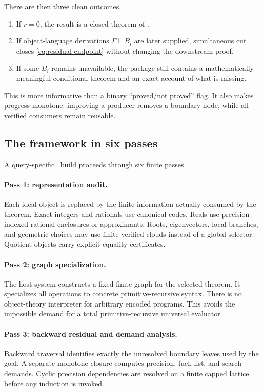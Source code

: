 There are then three clean outcomes.

\begin{enumerate}
\item If \(r=0\), the result is a closed theorem of \iPRA.
\item If object-language derivations \(\Gamma\vdash B_i\) are later supplied, simultaneous cut closes \eqref{eq:residual-endpoint} without changing the downstream proof.
\item If some \(B_i\) remains unavailable, the package still contains a mathematically meaningful conditional theorem and an exact account of what is missing.
\end{enumerate}

This is more informative than a binary ``proved/not proved'' flag.  It also makes progress monotone: improving a producer removes a boundary node, while all verified consumers remain reusable.

\subsection{The framework in six passes}

A query-specific \CIFER\ build proceeds through six finite passes.

\paragraph{Pass 1: representation audit.}
Each ideal object is replaced by the finite information actually consumed by the theorem.  Exact integers and rationals use canonical codes.  Reals use precision-indexed rational enclosures or approximants.  Roots, eigenvectors, local branches, and geometric choices may use finite verified clouds instead of a global selector.  Quotient objects carry explicit equality certificates.

\paragraph{Pass 2: graph specialization.}
The host system constructs a fixed finite graph for the selected theorem.  It specializes all operations to concrete primitive-recursive syntax.  There is no object-theory interpreter for arbitrary encoded programs.  This avoids the impossible demand for a total primitive-recursive universal evaluator.

\paragraph{Pass 3: backward residual and demand analysis.}
Backward traversal identifies exactly the unresolved boundary leaves used by the goal.  A separate monotone closure computes precision, fuel, list, and search demands.  Cyclic precision dependencies are resolved on a finite capped lattice before any induction is invoked.

